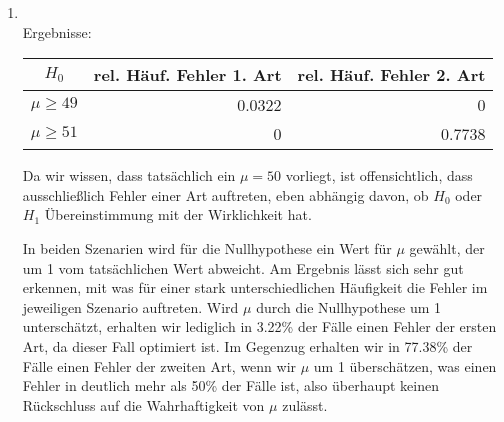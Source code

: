 \documentclass[a4paper]{scrartcl}
\def \blattnr {9}
\begin{document}
\begin{enumerate}[label=\bfseries \blattnr.\arabic*]
\begin{enumerate}
      \end{enumerate}

    \pagebreak
    \item \hfill \\ 
      
      
      \pagebreak
      Ergebnisse:
      
      \begin{tabular}{c|r|r}
       $H_0$ & rel. Häuf. Fehler 1. Art & rel. Häuf. Fehler 2. Art \\
       \hline
       $\mu \geq 49$ & 0.0322 & 0 \\
       $\mu \geq 51$ & 0 & 0.7738
      \end{tabular}
      
      Da wir wissen, dass tatsächlich ein $\mu=50$ vorliegt, ist offensichtlich, 
      dass ausschließlich Fehler einer Art auftreten, eben abhängig davon, ob $H_0$ 
      oder $H_1$ Übereinstimmung mit der Wirklichkeit hat.
      
      In beiden Szenarien wird für die Nullhypothese ein Wert für $\mu$ gewählt, der 
      um 1 vom tatsächlichen Wert abweicht. Am Ergebnis lässt sich sehr gut erkennen,
      mit was für einer stark unterschiedlichen Häufigkeit die Fehler im jeweiligen 
      Szenario auftreten. Wird $\mu$ durch die Nullhypothese um 1 unterschätzt, 
      erhalten wir lediglich in 3.22\% der Fälle einen Fehler der ersten Art, 
      da dieser Fall optimiert ist. Im Gegenzug erhalten wir in 77.38\% der Fälle 
      einen Fehler der zweiten Art, wenn wir $\mu$ um 1 überschätzen, was einen 
      Fehler in deutlich mehr als 50\% der Fälle ist, also überhaupt keinen Rückschluss auf 
      die Wahrhaftigkeit von $\mu$ zulässt.

\end{enumerate}
\end{document}
